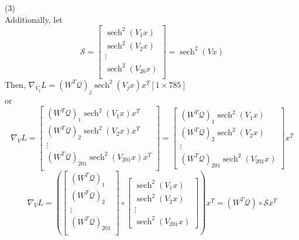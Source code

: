 \documentclass{report}
\DeclareMathOperator{\sech}{sech} %
\newcommand{\tab}{\-\hspace{0.5cm}}
\begin{document}
(3)\\
Additionally, let
$$ \mathcal{S} = \begin{bmatrix}
\sech^2(V_1 x) \\
\sech^2(V_2 x) \\
\vdots \\
\sech^2(V_{26} x)\\
\end{bmatrix} = \sech^2(Vx) $$
Then, $\nabla_{V_j} L = (W^T \mathcal{Q})_j \sech^2(V_jx)x^T $\tab\footnotesize$[1\times785]$\normalsize\\
\tab or
$$ \nabla_{V} L = \begin{bmatrix}
(W^T \mathcal{Q})_1 \sech^2(V_1 x)x^T \\
(W^T \mathcal{Q})_2 \sech^2(V_2 x)x^T \\
\vdots \\
(W^T \mathcal{Q})_{201} \sech^2(V_{201}x)x^T \\
\end{bmatrix} = \begin{bmatrix}
(W^T \mathcal{Q})_1 \sech^2(V_1 x) \\
(W^T \mathcal{Q})_2 \sech^2(V_2 x) \\
\vdots \\
(W^T \mathcal{Q})_{201} \sech^2(V_{201}x)
\end{bmatrix} x^T $$
$$\nabla_{V} L = \left(\begin{bmatrix}
(W^T \mathcal{Q})_1 \\
(W^T \mathcal{Q})_2 \\
\vdots \\
(W^T \mathcal{Q})_{201} \\
\end{bmatrix} \circ \begin{bmatrix}
\sech^2(V_1 x) \\
\sech^2(V_2 x) \\
\vdots \\
\sech^2(V_{201}x)
\end{bmatrix}\right) x^T = (W^T \mathcal{Q}) \circ \mathcal{S} x^T $$
\end{document}
